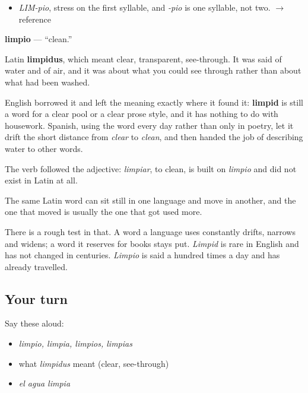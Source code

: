 \begin{sounds}
\begin{itemize}
\raggedright
  \item \emph{LIM-pio}, stress on the first syllable, and \emph{-pio} is one syllable, not two. $\to$ reference
\end{itemize}
\end{sounds}

\begin{cousinweb}
\textbf{limpio} — \textquotedblleft{}clean.\textquotedblright{}

Latin \textbf{limpidus}, which meant clear, transparent, see-through. It was said of water and of air, and it was about what you could see through rather than about what had been washed.

English borrowed it and left the meaning exactly where it found it: \textbf{limpid} is still a word for a clear pool or a clear prose style, and it has nothing to do with housework. Spanish, using the word every day rather than only in poetry, let it drift the short distance from \emph{clear} to \emph{clean}, and then handed the job of describing water to other words.

The verb followed the adjective: \emph{limpiar}, to clean, is built on \emph{limpio} and did not exist in Latin at all.
\end{cousinweb}

\begin{grammarlens}[title={What you've built}]
The same Latin word can sit still in one language and move in another, and the one that moved is usually the one that got used more.

There is a rough test in that. A word a language uses constantly drifts, narrows and widens; a word it reserves for books stays put. \emph{Limpid} is rare in English and has not changed in centuries. \emph{Limpio} is said a hundred times a day and has already travelled.
\end{grammarlens}

\subsection*{Your turn}
Say these aloud:

\begin{itemize}
\raggedright
  \item \emph{limpio, limpia, limpios, limpias}
  \item what \emph{limpidus} meant (clear, see-through)
  \item \emph{el agua limpia}
\end{itemize}

